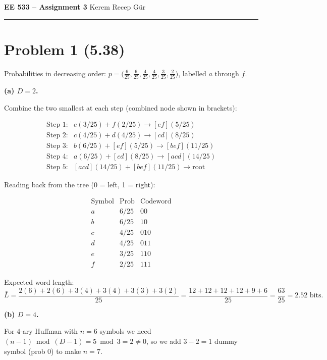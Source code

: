 \documentclass[11pt,a4paper]{article}
\begin{document}
\begin{center}
{\large\textbf{EE 533 -- Assignment 3}} \quad Kerem Recep Gür 
\end{center}
\medskip\hrule\bigskip

\section*{Problem 1 \normalfont\small(5.38)}

Probabilities in decreasing order:
$p = \bigl(\tfrac{6}{25}, \tfrac{6}{25}, \tfrac{4}{25}, \tfrac{4}{25},
\tfrac{3}{25}, \tfrac{2}{25}\bigr)$, labelled $a$ through $f$.

\medskip
\textbf{(a) $D=2$.}

Combine the two smallest at each step (combined node shown in brackets):

\[
\begin{array}{ll}
\text{Step 1:} & e(3/25)+f(2/25)\to [ef](5/25)\\
\text{Step 2:} & c(4/25)+d(4/25)\to [cd](8/25)\\
\text{Step 3:} & b(6/25)+[ef](5/25)\to [bef](11/25)\\
\text{Step 4:} & a(6/25)+[cd](8/25)\to [acd](14/25)\\
\text{Step 5:} & [acd](14/25)+[bef](11/25)\to \text{root}
\end{array}
\]

Reading back from the tree (0 = left, 1 = right):

\[
\begin{array}{c|c|c}
\text{Symbol} & \text{Prob} & \text{Codeword}\\\hline
a & 6/25 & 00 \\
b & 6/25 & 10 \\
c & 4/25 & 010 \\
d & 4/25 & 011 \\
e & 3/25 & 110 \\
f & 2/25 & 111
\end{array}
\]

Expected word length:
\[
\bar{L} = \frac{2(6)+2(6)+3(4)+3(4)+3(3)+3(2)}{25}
= \frac{12+12+12+12+9+6}{25} = \frac{63}{25} = 2.52 \text{ bits}.
\]

\medskip
\textbf{(b) $D=4$.}

For 4-ary Huffman with $n=6$ symbols we need $(n-1)\bmod(D-1)=5\bmod 3=2\neq 0$,
so we add $3-2=1$ dummy symbol (prob 0) to make $n=7$.
\end{document}
